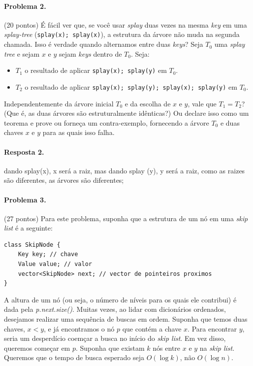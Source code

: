 \documentclass{article}
\begin{document}
\paragraph{Problema 2.} (20 pontos)
É fácil ver que, se você usar \textit{splay} duas vezes na mesma \textit{key} em uma \textit{splay-tree} (\texttt{splay(x); splay(x)}), a estrutura da árvore não muda na segunda chamada.
%
Isso é verdade quando alternamos entre duas \textit{keys}? Seja $T_0$ uma \textit{splay tree} e sejam $x$ e $y$ sejam \textit{keys} dentro de $T_0$. Seja:

\begin{itemize}
    \item $T_1$ o resultado de aplicar \texttt{splay(x); splay(y)} em $T_0$.
    \item $T_2$ o resultado de aplicar \texttt{splay(x); splay(y); splay(x); splay(y)} em $T_0$.
\end{itemize}

Independentemente da árvore inicial $T_0$ e da escolha de $x$ e $y$, vale que $T_1 = T_2$? (Que
é, as duas árvores são estruturalmente idênticas?) Ou declare isso como um teorema e prove ou
forneça um contra-exemplo, fornecendo a árvore $T_0$ e duas chaves $x$ e $y$ para as quais isso falha.

\paragraph{Resposta 2.} dando splay(x), x será a raiz, mas dando splay (y), y será a raiz, como as raizes são diferentes, as árvores são diferentes;

\paragraph{Problema 3.} (27 pontos) 
Para este problema, suponha que a estrutura de um nó em
uma \textit{skip list} é a seguinte:

\begin{lstlisting}
class SkipNode {
    Key key; // chave
    Value value; // valor
    vector<SkipNode> next; // vector de pointeiros proximos
}
\end{lstlisting}

A altura de um nó (ou seja, o número de níveis para os quais ele contribui) é dada pela \textit{p.next.size()}.
Muitas vezes, ao lidar com dicionários ordenados, desejamos realizar uma sequência de buscas em ordem. Suponha que temos duas chaves, $x < y$, e já encontramos o nó $p$ que contém a chave $x$. Para encontrar $y$, seria um desperdício coemçar a busca no início do \textit{skip list}. Em vez disso, queremos começar em $p$. Suponha que existam $k$ nós entre
$x$ e $y$ na \textit{skip list}. Queremos que o tempo de busca esperado seja $O(\log k)$, não $O(\log n)$.
\end{document}
